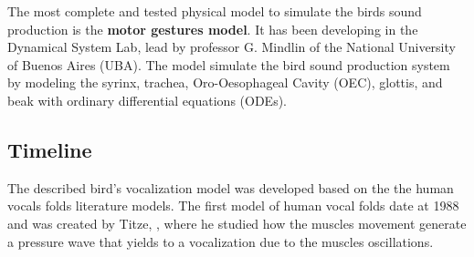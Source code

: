 The most complete and tested physical model to simulate the birds sound production is the \textbf{motor gestures model}. It has been developing in the Dynamical System Lab, lead by professor G. Mindlin of the National University of Buenos Aires (UBA). The model simulate the bird sound production system by modeling the syrinx, trachea, Oro-Oesophageal Cavity (OEC), glottis, and beak with ordinary differential equations (ODEs). 


\subsection{Timeline}

The described bird's vocalization model was developed based on the the human vocals folds literature models. The first model of human vocal folds date at 1988 and was created by Titze, \cite{Titze1998}, where he studied how the muscles movement generate a pressure wave that yields to a vocalization due to the muscles oscillations. 


